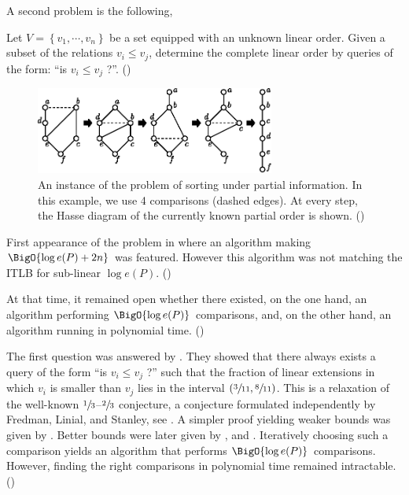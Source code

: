 
A second problem is the following,

Let $V = \left\{{v_1 , \cdots , v_n }\right\}$ be a set equipped with an unknown linear order. Given a subset of the relations $v_i \leq v_j$, determine the complete linear order by queries of the form: ``is $v_i \leq v_j$ ?''. (\cite{cardinal2013sorting})


\begin{figure}
	\centering
	\includegraphics[width=0.7\textwidth]{fig/supi/ex1}
	\caption{\label{fig:supi/ex1} An instance of the problem of sorting under partial information. In this example, we use 4 comparisons (dashed edges). At every step, the Hasse diagram of the currently known partial order is shown. (\cite{cardinal2013sorting})}
\end{figure}


First appearance of the problem in \cite{fredman1976good} where an algorithm making $\BigO{\log e(P) + 2n}$ was featured. However this algorithm was not matching the ITLB for sub-linear $\log e(P)$. (\cite{cardinal2013sorting})

At that time, it remained open whether there existed, on the one hand, an algorithm performing $\BigO{\log e(P)}$ comparisons, and, on the other hand, an algorithm running in polynomial time. (\cite{cardinal2013sorting})

The first question was answered by \cite{kahn1984balancing}. They showed that there always exists a query of the form ``is $v_i \leq v_j$ ?'' such that the fraction of linear extensions in which $v_i$ is smaller than $v_j$ lies in the interval $(\sfrac{3}{11}, \sfrac{8}{11})$. This is a relaxation of the well-known $\sfrac{1}{3}$--$\sfrac{2}{3}$ conjecture, a conjecture formulated independently by Fredman, Linial, and Stanley, see \cite{linial1984information}. A simpler proof yielding weaker bounds was given by \cite{kahn1991balancing}. Better bounds were later given by \cite{brightwell1995balancing}, and \cite{brightwell1999balanced}. Iteratively choosing such a comparison yields an algorithm that performs $\BigO{\log e(P)}$ comparisons. However, finding the right comparisons in polynomial time remained intractable. (\cite{cardinal2013sorting})

